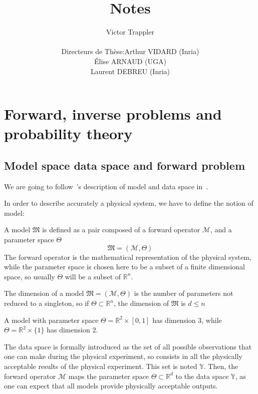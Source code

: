 \documentclass[a4paper,11pt]{article}
\newcommand{\Yspace}{\mathbb{Y}}
\theoremstyle{defi}
\numberwithin{thmCounter}{section}
\begin{document}
\title{Notes}

\author{Victor Trappler \\[1cm]
  \begin{tabular}{lr}
    Directeurs de Thèse: & Arthur VIDARD (Inria) \\
                        & Élise ARNAUD (UGA)\\
                        & Laurent DEBREU (Inria)
  \end{tabular}
}

\maketitle
\section{Forward, inverse problems and probability theory}


\subsection{Model space data space and forward problem}
\label{sec:model_space_data_space}
We are going to follow~\citeauthor{tarantola_inverse_2005}'s description of model and data space in~\cite{tarantola_inverse_2005}.

In order to describe accurately a physical system, we have to define the notion of model:
\begin{definition}[Model]
  A model $\mathfrak{M}$ is defined as a pair composed of a forward operator $\mathcal{M}$, and a parameter space $\Theta$
  \begin{equation*}
    \mathfrak{M} = (\mathcal{M}, \Theta)
  \end{equation*}
The forward operator is the mathematical representation of the physical system, while the parameter space is chosen here to be a subset of a finite dimensional space, so usually $\Theta$ will be a subset of $\mathbb{R}^n$. 
\end{definition}
\begin{remark}
  The dimension of a model $\mathfrak{M}=(\mathcal{M},\Theta)$ is the number of parameters not reduced to a singleton, so if $\Theta \subset \mathbb{R}^n$, the dimension of $\mathfrak{M}$ is $d \leq n$
\end{remark}
\begin{example}
  A model with parameter space $\Theta = \mathbb{R}^2\times [0, 1]$ has dimension $3$, while $\Theta = \mathbb{R}^2 \times \{1\}$ has dimension $2$.
\end{example}
The data space is formally introduced as the set of all possible observations that one can make during the physical experiment, so consists in all the physically acceptable results of the physical experiment. This set is noted $\Yspace$.
Then, the forward operator $\mathcal{M}$ maps the parameter space $\Theta \subset \mathbb{R}^{d}$ to the data space $\Yspace$, as one can expect that all models provide physically acceptable outputs.
\end{document}
